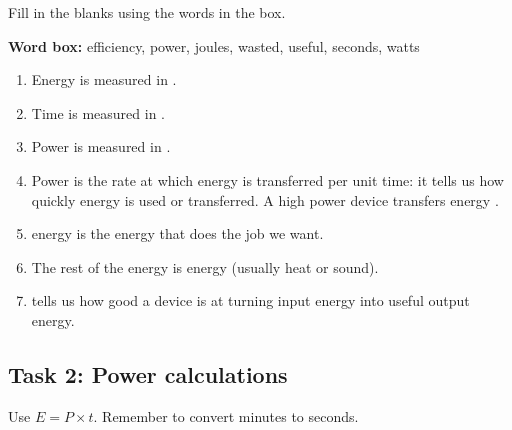 \documentclass[11pt,a4paper]{article}
\begin{document}
Fill in the blanks using the words in the box.

\textbf{Word box:} efficiency, power, joules, wasted, useful, seconds, watts

\begin{enumerate}[label=\alph*)]
    \item Energy is measured in \underline{\hspace{3cm}}.
    \item Time is measured in \underline{\hspace{3cm}}.
    \item Power is measured in \underline{\hspace{3cm}}.
    \item Power is the rate at which energy is transferred per unit time: it tells us how quickly energy is used or transferred. A high power device transfers energy \underline{\hspace{2cm}}.
    \item \underline{\hspace{3cm}} energy is the energy that does the job we want.
    \item The rest of the energy is \underline{\hspace{3cm}} energy (usually heat or sound).
    \item \underline{\hspace{3cm}} tells us how good a device is at turning input energy into useful output energy.
\end{enumerate}

\subsection*{Task 2: Power calculations}

Use $E = P \times t$. Remember to convert minutes to seconds.
\end{document}
